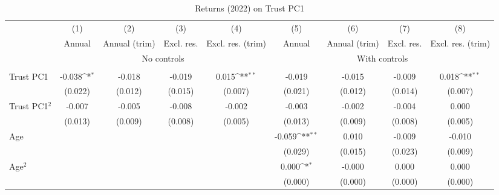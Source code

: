 \begin{table}[htbp]\centering
\def\sym#1{\ifmmode^{#1}\else\(^{#1}\)\fi}
\caption{Returns (2022) on Trust PC1}
\begin{tabular}{l*{8}{c}}
\toprule
          &\multicolumn{1}{c}{(1)}&\multicolumn{1}{c}{(2)}&\multicolumn{1}{c}{(3)}&\multicolumn{1}{c}{(4)}&\multicolumn{1}{c}{(5)}&\multicolumn{1}{c}{(6)}&\multicolumn{1}{c}{(7)}&\multicolumn{1}{c}{(8)}\\
          &\multicolumn{1}{c}{Annual}&\multicolumn{1}{c}{Annual (trim)}&\multicolumn{1}{c}{Excl. res.}&\multicolumn{1}{c}{Excl. res. (trim)}&\multicolumn{1}{c}{Annual}&\multicolumn{1}{c}{Annual (trim)}&\multicolumn{1}{c}{Excl. res.}&\multicolumn{1}{c}{Excl. res. (trim)}\\
& \multicolumn{4}{c}{No controls} & \multicolumn{4}{c}{With controls} \\\\ \cmidrule(lr){2-5}\cmidrule(lr){6-9}
Trust PC1 &   -0.038\sym{*}  &   -0.018         &   -0.019         &    0.015\sym{**} &   -0.019         &   -0.015         &   -0.009         &    0.018\sym{**} \\
          &  (0.022)         &  (0.012)         &  (0.015)         &  (0.007)         &  (0.021)         &  (0.012)         &  (0.014)         &  (0.007)         \\
Trust PC1$^{2}$&   -0.007         &   -0.005         &   -0.008         &   -0.002         &   -0.003         &   -0.002         &   -0.004         &    0.000         \\
          &  (0.013)         &  (0.009)         &  (0.008)         &  (0.005)         &  (0.013)         &  (0.009)         &  (0.008)         &  (0.005)         \\
Age       &                  &                  &                  &                  &   -0.059\sym{**} &    0.010         &   -0.009         &   -0.010         \\
          &                  &                  &                  &                  &  (0.029)         &  (0.015)         &  (0.023)         &  (0.009)         \\
Age$^{2}$ &                  &                  &                  &                  &    0.000\sym{*}  &   -0.000         &    0.000         &    0.000         \\
          &                  &                  &                  &                  &  (0.000)         &  (0.000)         &  (0.000)         &  (0.000)         \\

\end{tabular}
\end{table}

